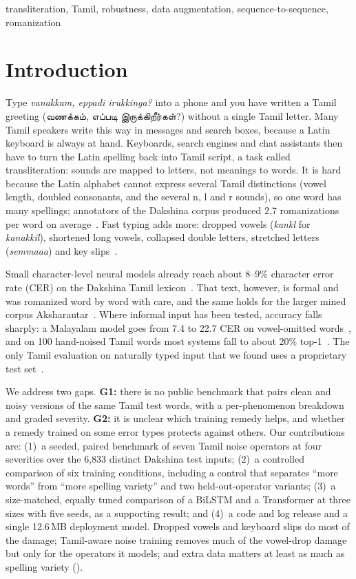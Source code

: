 \documentclass[conference]{IEEEtran}
\newcommand{\tamil}[1]{{\tamilfont #1}}
\begin{document}
\begin{IEEEkeywords}
transliteration, Tamil, robustness, data augmentation, sequence-to-sequence, romanization
\end{IEEEkeywords}

\section{Introduction}
Type \emph{vanakkam, eppadi irukkinga?} into a phone and you have written a Tamil greeting (\tamil{வணக்கம், எப்படி இருக்கிறீர்கள்?}) without a single Tamil letter.
Many Tamil speakers write this way in messages and search boxes, because a Latin keyboard is always at hand.
Keyboards, search engines and chat assistants then have to turn the Latin spelling back into Tamil script, a task called transliteration: sounds are mapped to letters, not meanings to words.
It is hard because the Latin alphabet cannot express several Tamil distinctions (vowel length, doubled consonants, and the several n, l and r sounds), so one word has many spellings; annotators of the Dakshina corpus produced 2.7 romanizations per word on average~\cite{roark2020dakshina}.
Fast typing adds more: dropped vowels (\emph{kankl} for \emph{kanakkil}), shortened long vowels, collapsed double letters, stretched letters (\emph{semmaaa}) and key slips~\cite{wolfsonkin2019latin,herath2024tamzhi}.

Small character-level neural models already reach about 8--9\% character error rate (CER) on the Dakshina Tamil lexicon~\cite{roark2020dakshina,kirov2024context}.
That text, however, is formal and was romanized word by word with care, and the same holds for the larger mined corpus Aksharantar~\cite{madhani2023aksharantar}.
Where informal input has been tested, accuracy falls sharply: a Malayalam model goes from 7.4 to 22.7 CER on vowel-omitted words~\cite{baiju2024malayalam}, and on 100 hand-noised Tamil words most systems fall to about 20\% top-1~\cite{azam2025beyond}.
The only Tamil evaluation on naturally typed input that we found uses a proprietary test set~\cite{hellsten2017keyboard}.

We address two gaps.
\textbf{G1:} there is no public benchmark that pairs clean and noisy versions of the same Tamil test words, with a per-phenomenon breakdown and graded severity.
\textbf{G2:} it is unclear which training remedy helps, and whether a remedy trained on some error types protects against others.
Our contributions are:
(1)~a seeded, paired benchmark of seven Tamil noise operators at four severities over the 6{,}833 distinct Dakshina test inputs;
(2)~a controlled comparison of six training conditions, including a control that separates ``more words'' from ``more spelling variety'' and two held-out-operator variants;
(3)~a size-matched, equally tuned comparison of a BiLSTM and a Transformer at three sizes with five seeds, as a supporting result;
and (4)~a code and log release and a single 12.6\,MB deployment model.
Dropped vowels and keyboard slips do most of the damage; Tamil-aware noise training removes much of the vowel-drop damage but only for the operators it models; and extra data matters at least as much as spelling variety ().
\end{document}
